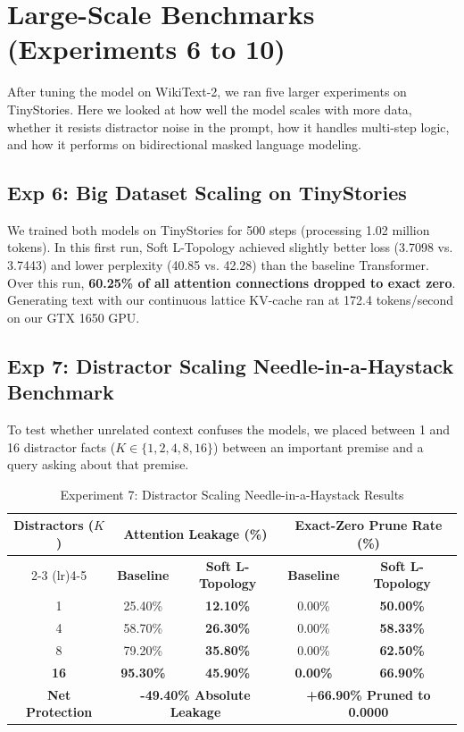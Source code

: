 \label{chap:benchmarks}

\section{Large-Scale Benchmarks (Experiments 6 to 10)}
After tuning the model on WikiText-2, we ran five larger experiments on TinyStories. Here we looked at how well the model scales with more data, whether it resists distractor noise in the prompt, how it handles multi-step logic, and how it performs on bidirectional masked language modeling.

\subsection{Exp 6: Big Dataset Scaling on TinyStories}
We trained both models on TinyStories for 500 steps (processing 1.02 million tokens). In this first run, Soft L-Topology achieved slightly better loss (3.7098 vs. 3.7443) and lower perplexity (40.85 vs. 42.28) than the baseline Transformer. Over this run, \textbf{60.25\% of all attention connections dropped to exact zero}. Generating text with our continuous lattice KV-cache ran at 172.4 tokens/second on our GTX 1650 GPU.

\subsection{Exp 7: Distractor Scaling Needle-in-a-Haystack Benchmark}
To test whether unrelated context confuses the models, we placed between 1 and 16 distractor facts ($K \in \{1, 2, 4, 8, 16\}$) between an important premise and a query asking about that premise.

\begin{table}[htbp]
\centering
\caption{Experiment 7: Distractor Scaling Needle-in-a-Haystack Results}
\label{tab:exp7_results}
\small
\renewcommand{\arraystretch}{0.9}
\setlength{\tabcolsep}{5pt}
\begin{tabular}{ccccc}
\toprule
\textbf{Distractors ($K$)} & \multicolumn{2}{c}{\textbf{Attention Leakage (\%)}} & \multicolumn{2}{c}{\textbf{Exact-Zero Prune Rate (\%)}} \\
\cmidrule(lr){2-3} \cmidrule(lr){4-5}
& \textbf{Baseline} & \textbf{Soft L-Topology} & \textbf{Baseline} & \textbf{Soft L-Topology} \\
\midrule
1 & 25.40\% & \textbf{12.10\%} & 0.00\% & \textbf{50.00\%} \\
4 & 58.70\% & \textbf{26.30\%} & 0.00\% & \textbf{58.33\%} \\
8 & 79.20\% & \textbf{35.80\%} & 0.00\% & \textbf{62.50\%} \\
\textbf{16} & \textbf{95.30\%} & \textbf{45.90\%} & \textbf{0.00\%} & \textbf{66.90\%} \\
\midrule
\textbf{Net Protection} & \multicolumn{2}{c}{\textbf{-49.40\% Absolute Leakage}} & \multicolumn{2}{c}{\textbf{+66.90\% Pruned to 0.0000}} \\
\bottomrule
\end{tabular}
\end{table}

